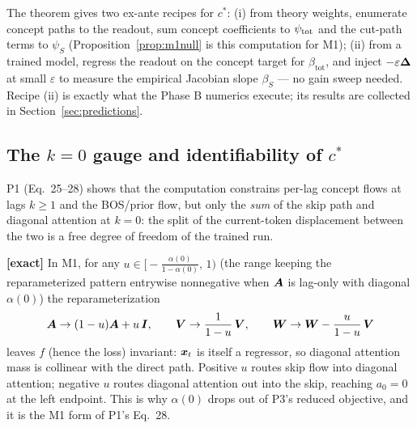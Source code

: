\documentclass{article}
\begin{document}
The theorem gives two ex-ante recipes for $c^*$: (i) from theory weights, enumerate concept paths to the readout, sum concept coefficients to $\psi_{\mathrm{tot}}$ and the cut-path terms to $\psi_S$ (Proposition~\ref{prop:m1null} is this computation for M1); (ii) from a trained model, regress the readout on the concept target for $\beta_{\mathrm{tot}}$, and inject $-\varepsilon\boldsymbol{\Delta}$ at small $\varepsilon$ to measure the empirical Jacobian slope $\beta_S$ --- no gain sweep needed. Recipe (ii) is exactly what the Phase B numerics execute; its results are collected in Section~\ref{sec:predictions}.

\subsection{The $k = 0$ gauge and identifiability of $c^*$}

P1 (Eq.~25--28) shows that the computation constrains per-lag concept flows at lags $k \ge 1$ and the BOS/prior flow, but only the \emph{sum} of the skip path and diagonal attention at $k = 0$: the split of the current-token displacement between the two is a free degree of freedom of the trained run.

\begin{prop}[M1 realization of the $k = 0$ gauge]\label{prop:kzero}
\textbf{[exact]} In M1, for any $u \in \big[-\tfrac{\alpha(0)}{1 - \alpha(0)},\, 1\big)$ (the range keeping the reparameterized pattern entrywise nonnegative when $\boldsymbol{A}$ is lag-only with diagonal $\alpha(0)$) the reparameterization
\begin{equation}
    \boldsymbol{A} \to (1-u)\boldsymbol{A} + u\,\boldsymbol{I}, \qquad
    \boldsymbol{V} \to \frac{1}{1-u}\,\boldsymbol{V}, \qquad
    \boldsymbol{W} \to \boldsymbol{W} - \frac{u}{1-u}\,\boldsymbol{V}
\end{equation}
leaves $f$ (hence the loss) invariant: $\boldsymbol{x}_t$ is itself a regressor, so diagonal attention mass is collinear with the direct path. Positive $u$ routes skip flow into diagonal attention; negative $u$ routes diagonal attention out into the skip, reaching $a_0 = 0$ at the left endpoint. This is why $\alpha(0)$ drops out of P3's reduced objective, and it is the M1 form of P1's Eq.~28.
\end{prop}
\end{document}
